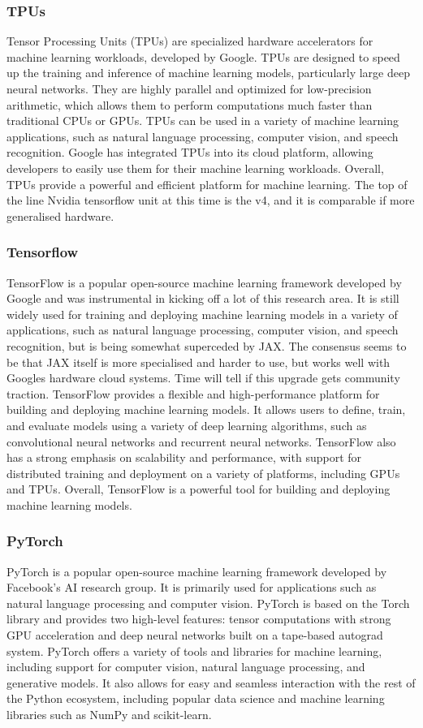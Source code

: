 \subsubsection{TPUs}
Tensor Processing Units (TPUs) are specialized hardware accelerators for machine learning workloads, developed by Google. TPUs are designed to speed up the training and inference of machine learning models, particularly large deep neural networks. They are highly parallel and optimized for low-precision arithmetic, which allows them to perform computations much faster than traditional CPUs or GPUs. TPUs can be used in a variety of machine learning applications, such as natural language processing, computer vision, and speech recognition. Google has integrated TPUs into its cloud platform, allowing developers to easily use them for their machine learning workloads. Overall, TPUs provide a powerful and efficient platform for machine learning.
The top of the line Nvidia tensorflow unit at this time is the v4, and it is comparable if more generalised hardware.
\subsubsection{Tensorflow}
TensorFlow is a popular open-source machine learning framework developed by Google and was instrumental in kicking off a lot of this research area. It is still widely used for training and deploying machine learning models in a variety of applications, such as natural language processing, computer vision, and speech recognition, but is being somewhat superceded by JAX. The consensus seems to be that JAX itself is more specialised and harder to use, but works well with Googles hardware cloud systems. Time will tell if this upgrade gets community traction. TensorFlow provides a flexible and high-performance platform for building and deploying machine learning models. It allows users to define, train, and evaluate models using a variety of deep learning algorithms, such as convolutional neural networks and recurrent neural networks. TensorFlow also has a strong emphasis on scalability and performance, with support for distributed training and deployment on a variety of platforms, including GPUs and TPUs. Overall, TensorFlow is a powerful tool for building and deploying machine learning models.
\subsubsection{PyTorch}
PyTorch is a popular open-source machine learning framework developed by Facebook's AI research group. It is primarily used for applications such as natural language processing and computer vision. PyTorch is based on the Torch library and provides two high-level features: tensor computations with strong GPU acceleration and deep neural networks built on a tape-based autograd system. PyTorch offers a variety of tools and libraries for machine learning, including support for computer vision, natural language processing, and generative models. It also allows for easy and seamless interaction with the rest of the Python ecosystem, including popular data science and machine learning libraries such as NumPy and scikit-learn. 
